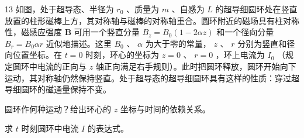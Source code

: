 \begin{problem}[第30届全国中学生物理竞赛决赛][超导圆环在磁棒上方运动]{13}
如图，处于超导态、半径为 $r_0$ 、质量为 $m$ 、自感为 $L$ 的超导细圆环处在竖直放置的柱形磁棒上方，其对称轴与磁棒的对称轴重合。圆环附近的磁场具有柱对称性，磁感应强度 $\pmb{B}$ 可用一个竖直分量 $B_z = B_0(1 - 2\alpha z)$ 和一个径向分量 $B_r = B_0\alpha r$ 近似地描述。这里 $B_0$ 、 $\alpha$ 为大于零的常量， $z$ 、 $r$ 分别为竖直和径向位置坐标。在 $t = 0$ 时刻，环心的坐标为 $z = 0$ 、 $r = 0$ ，环上电流为 $I_0$ （规定圆环中电流的正向与 $z$ 轴正向满足右手规则）。此时把圆环释放，圆环开始向下运动，其对称轴仍然保持竖直。处于超导态的超导细圆环具有这样的性质：穿过超导细圆环的磁通量保持不变。
\begin{subproblem}
圆环作何种运动？给出环心的 $z$ 坐标与时间的依赖关系。
\end{subproblem}
\begin{subproblem}
求 $t$ 时刻圆环中电流 $I$ 的表达式。
\end{subproblem}
\end{problem}